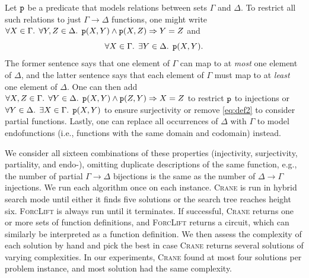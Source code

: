 \documentclass{article}
\newcommand{\predicate}{\texttt{\textup{p}}}
\begin{document}
Let $\predicate$ be a predicate that models relations between sets $\Gamma$ and
$\Delta$. To restrict all such relations to just $\Gamma \to \Delta$ functions,
one might write $\forall X \in \Gamma\text{. }\forall Y,Z \in \Delta\text{.
}\predicate(X, Y) \land \predicate(X, Z) \Rightarrow Y = Z$ and
\begin{equation}\label{eq:def2}
  \forall X \in \Gamma\text{. }\exists Y \in \Delta\text{. }\predicate(X, Y).
\end{equation}
The former sentence says that one element of $\Gamma$ can map to at \emph{most}
one element of $\Delta$, and the latter sentence says that each element of
$\Gamma$ must map to at \emph{least} one element of $\Delta$. One can then add
$\forall X,Z \in \Gamma\text{. }\forall Y \in \Delta\text{.
}\predicate(X, Y) \land \predicate(Z, Y) \Rightarrow X = Z$ to restrict
$\predicate$ to injections or $\forall Y \in \Delta\text{.
}\exists X \in \Gamma\text{. }\predicate(X, Y)$ to ensure surjectivity or remove
\cref{eq:def2} to consider partial functions. Lastly, one can replace all
occurrences of $\Delta$ with $\Gamma$ to model endofunctions (i.e., functions
with the same domain and codomain) instead.

We consider all sixteen combinations of these properties (injectivity,
surjectivity, partiality, and endo-), omitting duplicate descriptions of the
same function, e.g., the number of partial $\Gamma \to \Delta$ bijections is the
same as the number of $\Delta \to \Gamma$ injections. We run each algorithm once
on each instance. \textsc{Crane} is run in hybrid search mode until either it
finds five solutions or the search tree reaches height six. \textsc{ForcLift} is
always run until it terminates. If successful, \textsc{Crane} returns one or
more sets of function definitions, and \textsc{ForcLift} returns a circuit,
which can similarly be interpreted as a function definition. We then assess the
complexity of each solution by hand and pick the best in case \textsc{Crane}
returns several solutions of varying complexities. In our experiments,
\textsc{Crane} found at most four solutions per problem instance, and most
solution had the same complexity.

\end{document}
